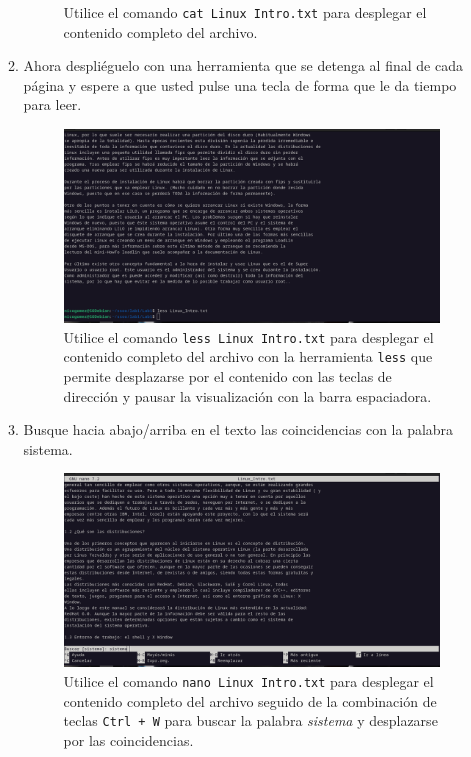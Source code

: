 \documentclass{templateNote}
\begin{document}
\begin{enumerate}
\begin{enumerate}[label=\alph*)]
\begin{figure}[H]
            Utilice el comando \texttt{cat Linux\ Intro.txt} para desplegar el contenido completo del archivo.
        \end{figure}
        \item Ahora despliéguelo con una herramienta que se detenga al final de cada página y espere a que usted pulse una tecla de forma que le da tiempo para leer.
        \begin{figure}[H]
            \centering
            \includegraphics[width=\textwidth]{img/ejerc3b.png}
            Utilice el comando \texttt{less Linux\ Intro.txt} para desplegar el contenido completo del archivo con la herramienta \texttt{less} que permite desplazarse por el contenido con las teclas de dirección y pausar la visualización con la barra espaciadora.
        \end{figure}
        \item Busque hacia abajo/arriba en el texto las coincidencias con la palabra sistema.
        \begin{figure}[H]
            \centering
            \includegraphics[width=\textwidth]{img/ejerc3c.png}
            Utilice el comando \texttt{nano Linux\ Intro.txt} para desplegar el contenido completo del archivo seguido de la combinación de teclas \texttt{Ctrl + W} para buscar la palabra \textit{sistema} y desplazarse por las coincidencias.

\end{figure}
\end{enumerate}
\end{enumerate}
\end{document}
